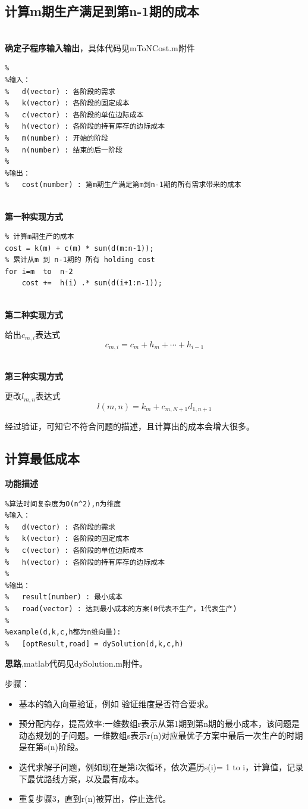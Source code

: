 \documentclass[UTF8]{ctexart}
\begin{document}
\subsection{计算m期生产满足到第n-1期的成本}
~\\
\textbf{确定子程序输入输出}，具体代码见mToNCost.m附件
\begin{lstlisting}
%
%输入：
%   d(vector) : 各阶段的需求
%   k(vector) : 各阶段的固定成本
%   c(vector) : 各阶段的单位边际成本
%   h(vector) : 各阶段的持有库存的边际成本
%   m(number) : 开始的阶段
%   n(number) : 结束的后一阶段
%
%输出：
%   cost(number) : 第m期生产满足第m到n-1期的所有需求带来的成本
\end{lstlisting}

~\\
\textbf{第一种实现方式}
\begin{lstlisting}
% 计算m期生产的成本
cost = k(m) + c(m) * sum(d(m:n-1));
% 累计从m 到 n-1期的 所有 holding cost 
for i=m  to  n-2
    cost +=  h(i) .* sum(d(i+1:n-1));
\end{lstlisting}

~\\
\textbf{第二种实现方式}

给出\( c_{m,i} \)表达式
\[ c_{m,i} = c_m + h_m + \cdots + h_{i-1} \]


~\\
\textbf{第三种实现方式}

更改\( l_{m,n} \)表达式
\[ l(m,n) = k_m + c_{m,N+1}d_{1,n+1} \]

经过验证，可知它不符合问题的描述，且计算出的成本会增大很多。


\subsection{计算最低成本}
\textbf{功能描述}
\begin{lstlisting}
%算法时间复杂度为O(n^2),n为维度
%输入：
%   d(vector) : 各阶段的需求
%   k(vector) : 各阶段的固定成本
%   c(vector) : 各阶段的单位边际成本
%   h(vector) : 各阶段的持有库存的边际成本
%
%输出：
%   result(number) : 最小成本
%   road(vector) : 达到最小成本的方案(0代表不生产，1代表生产)
%
%example(d,k,c,h都为n维向量):
%   [optResult,road] = dySolution(d,k,c,h)
\end{lstlisting}


\textbf{思路},matlab代码见dySolution.m附件。

步骤：
\begin{itemize}
    \item 基本的输入向量验证，例如 验证维度是否符合要求。
    \item 预分配内存，提高效率:一维数组r表示从第1期到第n期的最小成本，该问题是动态规划的子问题。一维数组s表示r(n)对应最优子方案中最后一次生产的时期是在第s(n)阶段。
    \item 迭代求解子问题，例如现在是第i次循环，依次遍历s(i)= 1 to i，计算值，记录下最优路线方案，以及最有成本。
    \item 重复步骤3，直到r(n)被算出，停止迭代。
\end{itemize}
\end{document}
